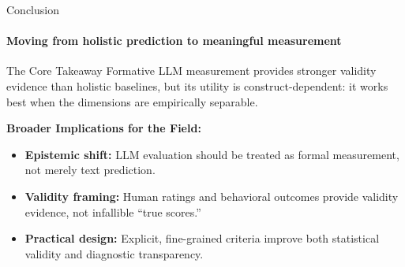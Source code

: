 





\begin{frame}{Conclusion}
\framesubtitle{Moving from holistic prediction to meaningful measurement}

\begin{block}{The Core Takeaway}
Formative LLM measurement provides stronger validity evidence than holistic baselines, but its utility is construct-dependent: it works best when the dimensions are empirically separable.
\end{block}

\vspace{0.1cm}

\textbf{Broader Implications for the Field:}
\vspace{0.05cm}
\begin{itemize}
    \setlength{\itemsep}{0.3cm} %
    \item \textbf{Epistemic shift:} LLM evaluation should be treated as formal measurement, not merely text prediction.
    \item \textbf{Validity framing:} Human ratings and behavioral outcomes provide validity evidence, not infallible ``true scores.''
    \item \textbf{Practical design:} Explicit, fine-grained criteria improve both statistical validity and diagnostic transparency.
\end{itemize}

\end{frame}